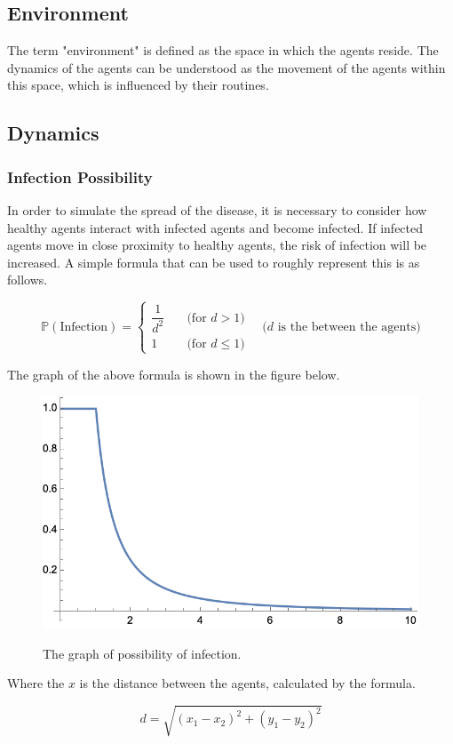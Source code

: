 \documentclass[12pt]{article}
\begin{document}
\subsection{Environment}
The term "environment" is defined as the space in which the agents reside. The dynamics of the agents can be understood as the movement of the agents within this space, which is influenced by their routines.

\subsection{Dynamics}
\subsubsection{Infection Possibility}
In order to simulate the spread of the disease, it is necessary to consider how healthy agents interact with infected agents and become infected. If infected agents move in close proximity to healthy agents, the risk of infection will be increased. A simple formula that can be used to roughly represent this is as follows.

\[
\mathbb{P}(\text{Infection})=\begin{cases}
	\dfrac{1}{d^2} &\quad \text{(for $d > 1$)} \\
	1 &\quad \text{(for $d \leq 1$)}
\end{cases}\quad\text{($d$ is the between the agents)}
\]

The graph of the above formula is shown in the figure below.

\begin{figure}[ht]
	\centering
	\includegraphics[width=0.55\linewidth]{./assets/infection-possibility-graph.png}
    \label{fig:infection-possibility-graph}
	\caption{The graph of possibility of infection.}
\end{figure}

Where the $x$ is the distance between the agents, calculated by the formula.

\[
d=\sqrt{(x_1-x_2)^2+(y_1-y_2)^2}
\]
\end{document}
